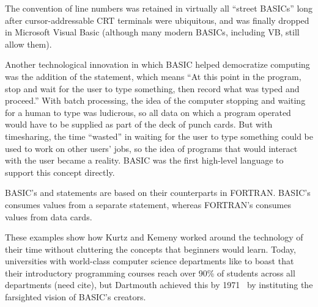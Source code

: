   \begin{geeknote}
  The convention of line numbers was retained in virtually all ``street
  BASICs'' long after cursor-addressable CRT terminals were ubiquitous,
  and was finally dropped in Microsoft Visual Basic (although many modern
  BASICs, including VB, still allow them).
  \end{geeknote}

Another technological innovation in which BASIC helped democratize
computing was the addition of the 
statement, which means ``At this point in the program, stop and wait for
the user to type something, then record what was typed and proceed.''
With batch processing, the
idea of the computer stopping and waiting for a human to type was
ludicrous, so all data on which a program operated would have to be
supplied as part of the deck of punch cards.
But with timesharing, the time ``wasted'' in waiting for the user to
type something could be used to work on other users' jobs, so
the idea of programs that would interact with the
user became a reality.  BASIC was the first high-level language to
support this concept directly.

  \begin{geeknote}
  BASIC's  and  statements are based on their
  counterparts in FORTRAN.  BASIC's  consumes values from a
  separate  statement, whereas FORTRAN's  consumes
  values from data cards.
  \end{geeknote}

These examples show how Kurtz and Kemeny worked around the technology of their
time without cluttering the concepts that beginners would learn.
Today, universities with world-class computer science
departments like to boast that their introductory programming courses
reach over 90\% of
students across all departments (need cite), but
Dartmouth achieved this by 1971~\cite{man_and_computer} by instituting the farsighted 
vision of BASIC's creators.



